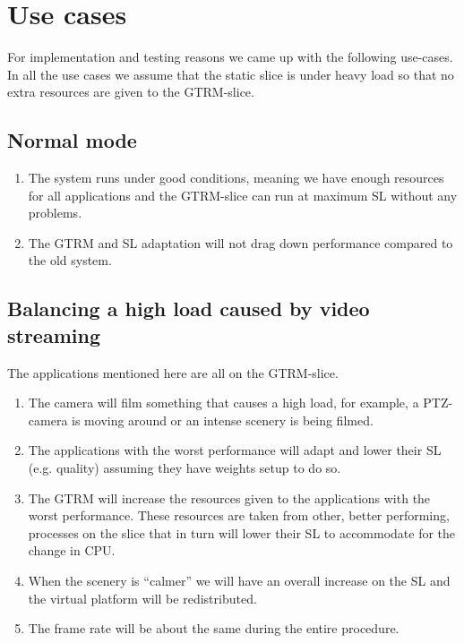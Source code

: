 \documentclass[nobiblatex]{LTHthesis}
\begin{document}
\chapter{Use cases}
\label{chp:usecases}

For implementation and testing reasons we came up with the following use-cases. In all the use cases we assume that the static slice is under heavy load so that no extra resources are given to the GTRM-slice. 
\section{Normal mode}
\begin{enumerate}
\item The system runs under good conditions, meaning we have enough resources for all applications and the GTRM-slice can run at maximum SL without any problems.
\item The GTRM and SL adaptation will not drag down performance compared to the old system.
\end{enumerate}
\section{Balancing a high load caused by video streaming}
The applications mentioned here are all on the GTRM-slice.

\begin{enumerate}
\item The camera will film something that causes a high load, for example, a PTZ-camera is moving around or an intense scenery is being filmed.
\item The applications with the worst performance  will adapt and lower their SL (e.g. quality) assuming they have weights setup to do so.
\item The GTRM will increase the resources given to the applications with the worst performance. These resources are taken from other, better performing,  processes on the slice that in turn will lower their SL to accommodate for the change in CPU.
\item When the scenery is “calmer” we will have an overall increase on the SL and the virtual platform will be redistributed.
\item The frame rate will be about the same during the entire procedure.
\end{enumerate}
\end{document}
